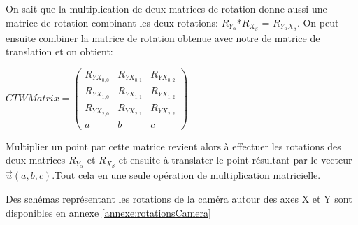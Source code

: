 \documentclass[../../Rapport RayTracer]{subfiles}
\begin{document}
On sait que la multiplication de deux matrices de rotation donne aussi une matrice de rotation combinant les deux rotations: $R_{Y_{\alpha}}$*$R_{X_{\beta}}$ = $R_{Y_{\alpha}X_{\beta}}$. On peut ensuite combiner la matrice de rotation obtenue avec notre de matrice de translation et on obtient:
\begin{center}
	$CTWMatrix =
	\begin{pmatrix}
		R_{YX_{0, 0}} & R_{YX_{0, 1}}  & R_{YX_{0, 2}}\\
		R_{YX_{1, 0}} & R_{YX_{1, 1}}  & R_{YX_{1, 2}}\\
		R_{YX_{2, 0}} & R_{YX_{2, 1}}  & R_{YX_{2, 2}}\\
		a & b & c
	\end{pmatrix}
	$
\end{center}

Multiplier un point par cette matrice revient alors à effectuer les rotations des deux matrices $R_{Y_{\alpha}}$ et $R_{X_{\beta}}$ et ensuite à translater le point résultant par le vecteur $\overrightarrow{u}(a, b, c)$.Tout cela en une seule opération de multiplication matricielle.

Des schémas représentant les rotations de la caméra autour des axes X et Y sont disponibles en annexe \ref{annexe:rotationsCamera}
\end{document}
